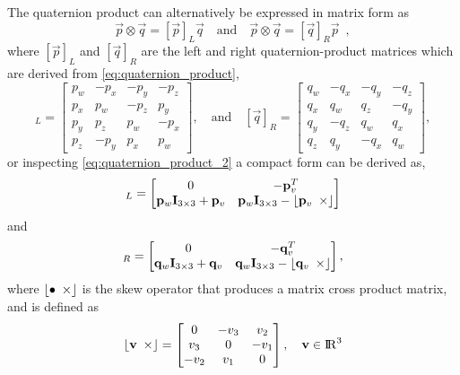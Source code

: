 The quaternion product can alternatively be expressed in matrix form as
%
\begin{equation}
  \Vec{p} \otimes \Vec{q} = [\Vec{p}]_{L} \Vec{q}
  \quad \text{and} \quad
  \Vec{p} \otimes \Vec{q} = [\Vec{q}]_{R} \Vec{p} \enspace ,
\end{equation}
%
where $[\Vec{p}]_{L}$ and $[\Vec{q}]_{R}$ are the left and right
quaternion-product matrices which are derived from
\eqref{eq:quaternion_product},
%
\begin{equation}
  [\Vec{p}]_{L} =
  \begin{bmatrix}
    p_w & -p_x & -p_y & -p_z \\
    p_x & p_w & -p_z & p_y \\
    p_y & p_z & p_w & -p_x \\
    p_z & -p_y & p_x & p_w
  \end{bmatrix},
  \quad \text{and} \quad
  [\Vec{q}]_{R} =
  \begin{bmatrix}
    q_w & -q_x & -q_y & -q_z \\
    q_x & q_w & q_z & -q_y \\
    q_y & -q_z & q_w & q_x \\
    q_z & q_y & -q_x & q_w
  \end{bmatrix},
\end{equation}
%
or inspecting \eqref{eq:quaternion_product_2} a compact form can be derived as,
%
\begin{equation}
  [\Vec{p}]_{L} =
  \begin{bmatrix}
    0 & -\Transpose{\Vec{p}_{v}} \\
    \Vec{p}_w \I_{3 \times 3} + \Vec{p}_{v} &
    \Vec{p}_w \I_{3 \times 3} -\Skew{\Vec{p}_{v}}
  \end{bmatrix}
\end{equation}
%
and
%
\begin{equation}
  [\Vec{q}]_{R} =
  \begin{bmatrix}
    0 & -\Transpose{\Vec{q}_{v}} \\
    \Vec{q}_w \I_{3 \times 3} + \Vec{q}_{v} &
    \Vec{q}_w \I_{3 \times 3} -\Skew{\Vec{q}_{v}}
  \end{bmatrix},
\end{equation}
%
where ${\lfloor \bullet \enspace \times \rfloor}$ is the skew operator that produces a matrix cross
product matrix, and is defined as
%
\begin{equation}
  {\lfloor {\mathbf{v}} \enspace \times \rfloor} =
  \begin{bmatrix}
    0 & -v_{3} & v_{2} \\
    v_{3} & 0 & -v_{1} \\
    -v_{2} & v_{1} & 0
  \end{bmatrix},
  \quad
  {\mathbf{v}} \in {\rm I\!R}^{3}
\end{equation}
%

